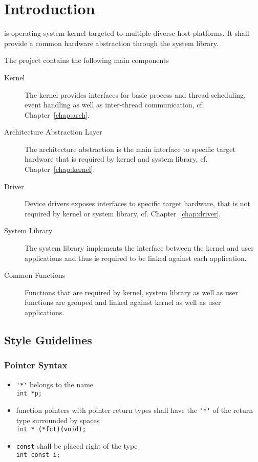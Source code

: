 \chapter{Introduction}
\brickos is operating system kernel targeted to multiple diverse host platforms. It shall provide a common hardware abstraction through the system library.

The project contains the following main components
\begin{description}
	\item[Kernel] The kernel provides interfaces for basic process and thread scheduling, event handling as well as inter-thread communication, cf. Chapter~\ref{chap:arch}.
	\item[Architecture Abstraction Layer] The architecture abstraction is the main interface to specific target hardware that is required by kernel and system library, cf. Chapter~\ref{chap:kernel}.
	\item[Driver] Device drivers exposes interfaces to specific target hardware, that is not required by kernel or system library, cf. Chapter~\ref{chap:driver}.
	\item[System Library] The system library implements the interface between the kernel and user applications and thus is required to be linked against each application.
	\item[Common Functions] Functions that are required by kernel, system library as well as user functions are grouped and linked against kernel as well as user applications.
\end{description}

\section{Style Guidelines}
\subsection{Pointer Syntax}
	\begin{itemize}
		\item \lstinline{'*'} belongs to the name\\
			\lstinline{int *p;}

		\item function pointers with pointer return types shall have the \lstinline{'*'} of the return type surrounded by spaces\\
		  	\lstinline{int * (*fct)(void);}

		\item \lstinline{const} shall be placed right of the type\\
			\lstinline{int const i;}
	\end{itemize}

